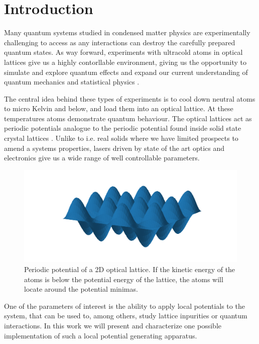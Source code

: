 \chapter{Introduction}

Many quantum systems studied in condensed matter physics are experimentally
challenging to access as any interactions can destroy the carefully prepared
quantum states. As way forward, experiments with ultracold atoms in
optical lattices give us a highly contorllable environment, giving us the
opportunity to simulate and explore quantum effects and expand our current
understanding of quantum mechanics and statistical physics \cite{Gross2017}.

The central idea behind these types of experiments is to cool down neutral
atoms to micro Kelvin and below, and load them into an optical lattice. At
these temperatures atoms demonstrate quantum behaviour. The optical lattices
act as periodic potentials analogue to the periodic potential found inside
solid state crystal lattices \cite{Lewenstein2007}. Unlike to i.e. real solids
where we have limited prospects to amend a systems properties, lasers driven
by state of the art optics and electronics give us a wide range of well
controllable parameters.

\begin{figure}[h]
  \centering
  \includegraphics[width=.8\textwidth]{images/optlat/default.pdf}
  \captionsetup{width=.8\textwidth}
  \caption{Periodic potential of a 2D optical lattice. If the kinetic energy
  of the atoms is below the potential energy of the lattice, the atoms will
  locate around the potential minimas.}
  \label{fig:optlat}
\end{figure}

One of the parameters of interest is the ability to apply local potentials
to the system, that can be used to, among others, study lattice inpurities
or quantum interactions. In this work we will present and characterize one
possible implementation of such a local potential generating apparatus.

